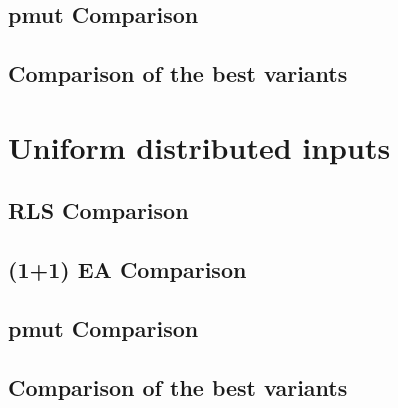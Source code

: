 


\subsection{pmut Comparison}





\subsection{Comparison of the best variants}





\section{Uniform distributed inputs}

\subsection{RLS Comparison}





\subsection{(1+1) EA Comparison}





\subsection{pmut Comparison}





\subsection{Comparison of the best variants}




